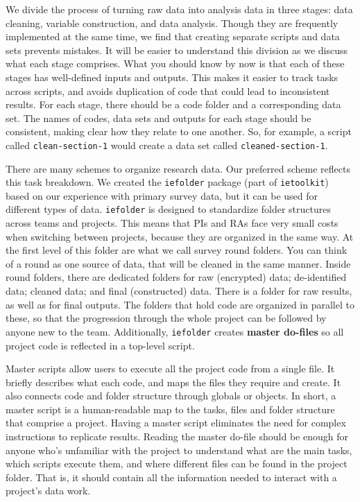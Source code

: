 We divide the process of turning raw data into analysis data in three stages: 
data cleaning, variable construction, and data analysis. 
Though they are frequently implemented at the same time, 
we find that creating separate scripts and data sets prevents mistakes. 
It will be easier to understand this division as we discuss what each stage comprises. 
What you should know by now is that each of these stages has well-defined inputs and outputs. 
This makes it easier to track tasks across scripts, 
and avoids duplication of code that could lead to inconsistent results. 
For each stage, there should be a code folder and a corresponding data set. 
The names of codes, data sets and outputs for each stage should be consistent,
making clear how they relate to one another. 
So, for example, a script called \texttt{clean-section-1} would create
a data set called \texttt{cleaned-section-1}.

There are many schemes to organize research data. 
Our preferred scheme reflects this task breakdown.
We created the \texttt{iefolder}
package (part of \texttt{ietoolkit})
based on our experience with primary survey data,
but it can be used for different types of data. 
\texttt{iefolder} is designed to standardize folder structures across teams and projects.
This means that PIs and RAs face very small costs when switching between projects, 
because they are organized in the same way. 
At the first level of this folder are what we call survey round folders. 
You can think of a round as one source of data, 
that will be cleaned in the same manner. 
Inside round folders, there are dedicated folders for 
raw (encrypted) data; de-identified data; cleaned data; and final (constructed) data. 
There is a folder for raw results, as well as for final outputs. 
The folders that hold code are organized in parallel to these, 
so that the progression through the whole project can be followed by anyone new to the team.  
Additionally, \texttt{iefolder} creates \textbf{master do-files}
so all project code is reflected in a top-level script.

Master scripts allow users to execute all the project code from a single file.
It briefly describes what each code, 
and maps the files they require and create. 
It also connects code and folder structure through globals or objects. 
In short, a master script is a human-readable map to the tasks, 
files and folder structure that comprise a project.  
Having a master script eliminates the need for complex instructions to replicate results. 
Reading the master do-file should be enough for anyone who's unfamiliar with the project
to understand what are the main tasks, which scripts execute them,
and where different files can be found in the project folder. 
That is, it should contain all the information needed to interact with a project's data work.

